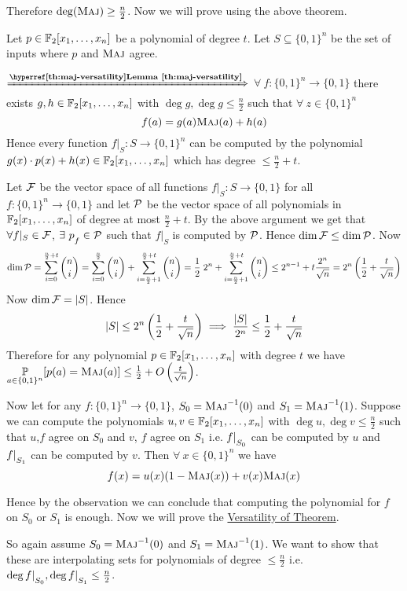 Therefore $\deg(\textsc{Maj})\geq \frac{n}{2}$. Now we will prove  using the above theorem. \vspace*{2mm}

\begin{proof-of-lemma}
Let $p\in \mathbb{F}_2[x_1,\dots, x_n]$ be a polynomial of degree $t$. Let $S\subseteq \{0,1\}^n$ be the set of inputs where $p$ and $\textsc{Maj}$ agree. \parinf

$\xRightarrow{\textbf{\lmref{maj-versatility}}}$ $\forall\ f:\{0,1\}^n\to \{0,1\}$ there exists $g,h\in\mathbb{F}_2[x_1,\dots, x_n]$ with $\deg g, \deg g\leq \frac{n}2$ such that $\forall \  z\in\{0,1\}^n$ $$f(a)=g(a)\textsc{Maj}(a)+h(a)$$Hence every function $f|_S:S\to \{0,1\}^n$ can be computed by the polynomial $g(x)\cdot p(x)+h(x)\in \mathbb{F}_2[x_1,\dots, x_n]$ which has degree $\leq \frac{n}{2}+t$. \parinn

Let $\mathcal{F}$ be the vector space  of all functions $f|_S:S\to \{0,1\}$ for all $f:\{0,1\}^n\to \{0,1\}$ and let $\mathcal{P}$ be the vector space of all polynomials in $\mathbb{F}_2[x_1,\dots, x_n]$ of degree at most $\frac{n}{2}+t$. By the above argument we get that $\forall f|_S\in \mathcal{F}$, $\exists \ p\strut_f\in \mathcal{P}$ such that $f|_S$ is computed by $\mathcal{P}$. Hence $\dim\mathcal{F}\leq \dim\mathcal{P}$. Now $$\dim \mathcal{P}=\sum_{i=0}^{\frac{n}2+t}\binom{n}{i}=\sum_{i=0}^{\frac{n}2}\binom{n}{i}+\sum_{i=\frac{n}2+1}^{\frac{n}2+t}\binom{n}{i}=\frac12\; 2^n+\sum_{i=\frac{n}2+1}^{\frac{n}2+t}\binom{n}{i}\leq 2^{n-1}+t\frac{2^n}{\sqrt{n}}=2^n\left(\frac12+\frac{t}{\sqrt{n}}\right)$$Now $\dim \mathcal{F}=|S|$. Hence $$|S|\leq 2^n\left(\frac12+\frac{t}{\sqrt{n}}\right)\implies \frac{|S|}{2^n}\leq \frac12+\frac{t}{\sqrt{n}}$$Therefore for any polynomial $p\in \mathbb{F}_2[x_1,\dots, x_n]$ with degree $t$ we have $\underset{a\in\{0,1\}^n}{\mathbb{P}}[p(a)=\textsc{Maj}(a)]\leq \frac12+O\left(\frac{t}{\sqrt{n}}\right)$.
\end{proof-of-lemma}


\begin{observation*}
	Now let for any $f:\{0,1\}^n\to \{0,1\}$, $S_0=\textsc{Maj}^{-1}(0)$ and $S_1=\textsc{Maj}^{-1}(1)$.  Suppose we can compute the polynomials $u,v\in\mathbb{F}_2[x_1,\dots, x_n]$ with $\deg u,\deg v\leq \frac{n}{2}$ such that $u$,$f$ agree on $S_0$ and $v$, $f$ agree on $S_1$ i.e. $f|\strut_{S_0}$ can be computed by $u$ and $f|\strut_{S_1}$ can be computed by $v$. Then $\forall \ x\in\{0,1\}^n$ we have $$f(x)=u(x)(1-\textsc{Maj}(x))+v(x)\textsc{Maj}(x)$$
\end{observation*}
Hence by the observation we can conclude that computing the polynomial for $f$ on $S_0$ or $S_1$ is enough. Now we will prove the \hyperref[th:maj-versatility]{Versatility of  Theorem}. \vspace*{2mm}

\begin{proof-of-theorem}
	So again assume $S_0=\textsc{Maj}^{-1}(0)$ and $S_1=\textsc{Maj}^{-1}(1)$. We want to show that these are interpolating sets for polynomials of degree $\leq \frac{n}{2}$ i.e. $\deg f|\strut_{S_0},\deg f|\strut_{S_1}\leq \frac{n}{2}$. 
\end{proof-of-theorem}